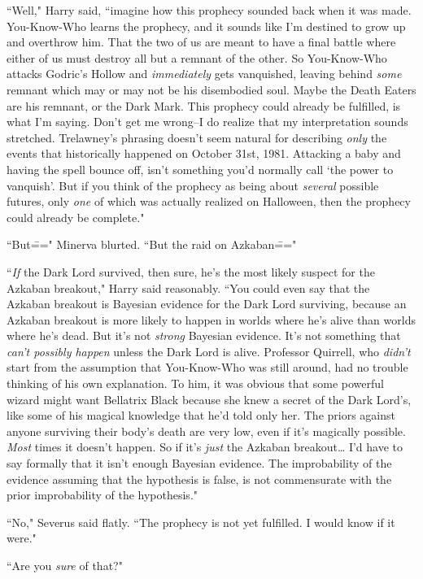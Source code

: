 ``Well," Harry said, ``imagine how this prophecy sounded back when it was made. You-Know-Who learns the prophecy, and it sounds like I'm destined to grow up and overthrow him. That the two of us are meant to have a final battle where either of us must destroy all but a remnant of the other. So You-Know-Who attacks Godric's Hollow and \emph{immediately} gets vanquished, leaving behind \emph{some} remnant which may or may not be his disembodied soul. Maybe the Death Eaters are his remnant, or the Dark Mark. This prophecy could already be fulfilled, is what I'm saying. Don't get me wrong\---I do realize that my interpretation sounds stretched. Trelawney's phrasing doesn't seem natural for describing \emph{only} the events that historically happened on October 31st, 1981. Attacking a baby and having the spell bounce off, isn't something you'd normally call `the power to vanquish'. But if you think of the prophecy as being about \emph{several} possible futures, only \emph{one} of which was actually realized on Halloween, then the prophecy could already be complete."

``But\===" Minerva blurted. ``But the raid on Azkaban\==="

``\emph{If} the Dark Lord survived, then sure, he's the most likely suspect for the Azkaban breakout," Harry said reasonably. ``You could even say that the Azkaban breakout is Bayesian evidence for the Dark Lord surviving, because an Azkaban breakout is more likely to happen in worlds where he's alive than worlds where he's dead. But it's not \emph{strong} Bayesian evidence. It's not something that \emph{can't possibly happen} unless the Dark Lord is alive. Professor Quirrell, who \emph{didn't} start from the assumption that You-Know-Who was still around, had no trouble thinking of his own explanation. To him, it was obvious that some powerful wizard might want Bellatrix Black because she knew a secret of the Dark Lord's, like some of his magical knowledge that he'd told only her. The priors against anyone surviving their body's death are very low, even if it's magically possible. \emph{Most} times it doesn't happen. So if it's \emph{just} the Azkaban breakout{\ldots} I'd have to say formally that it isn't enough Bayesian evidence. The improbability of the evidence assuming that the hypothesis is false, is not commensurate with the prior improbability of the hypothesis."

``No," Severus said flatly. ``The prophecy is not yet fulfilled. I would know if it were."

``Are you \emph{sure} of that?"

